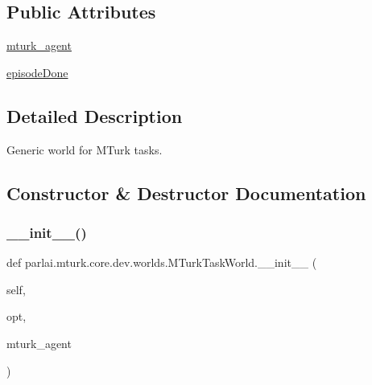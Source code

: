 \subsection*{Public Attributes}
\begin{DoxyCompactItemize}
\item 
\hyperlink{classparlai_1_1mturk_1_1core_1_1dev_1_1worlds_1_1MTurkTaskWorld_ac57f970ab26bb0526c73c03c1b8cad70}{mturk\+\_\+agent}
\item 
\hyperlink{classparlai_1_1mturk_1_1core_1_1dev_1_1worlds_1_1MTurkTaskWorld_a31c19dded93517b4a840dbba6dbb6612}{episode\+Done}
\end{DoxyCompactItemize}


\subsection{Detailed Description}
\begin{DoxyVerb}Generic world for MTurk tasks.
\end{DoxyVerb}
 

\subsection{Constructor \& Destructor Documentation}
\mbox{\label{classparlai_1_1mturk_1_1core_1_1dev_1_1worlds_1_1MTurkTaskWorld_a05dadf953dc8d31e3ab9251abb97d591}} 
\subsubsection{\texorpdfstring{\+\_\+\+\_\+init\+\_\+\+\_\+()}{\_\_init\_\_()}}
{\footnotesize\ttfamily def parlai.\+mturk.\+core.\+dev.\+worlds.\+M\+Turk\+Task\+World.\+\_\+\+\_\+init\+\_\+\+\_\+ (\begin{DoxyParamCaption}\item[{}]{self,  }\item[{}]{opt,  }\item[{}]{mturk\+\_\+agent }\end{DoxyParamCaption})}

